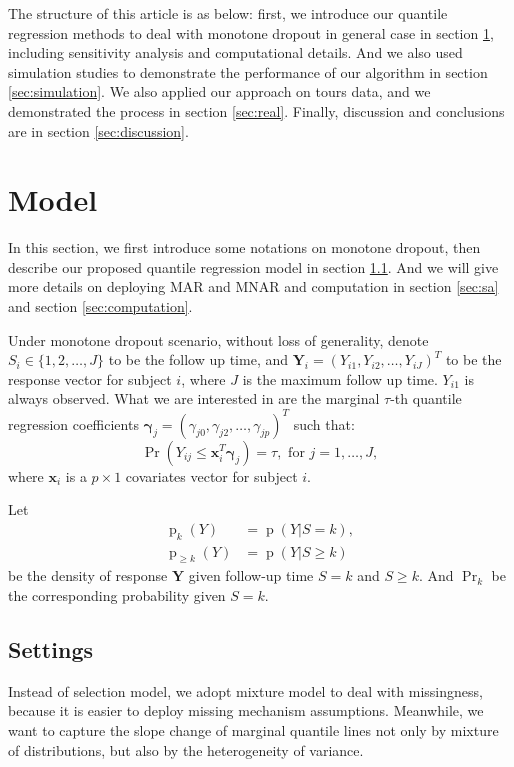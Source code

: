 \documentclass[12pt]{article}
\DeclareMathOperator{\pr}{p}
\DeclareMathOperator{\prob}{Pr}
\begin{document}
The structure of this article is as below: first, we introduce our
quantile regression methods to deal with monotone dropout in general
case in section \ref{sec:model}, including sensitivity analysis and
computational details.  And we also used simulation studies to
demonstrate the performance of our algorithm in section
\ref{sec:simulation}. We also applied our approach on tours data, and
we demonstrated the process in section \ref{sec:real}. Finally,
discussion and conclusions are in section \ref{sec:discussion}.

\section{Model}
\label{sec:model}

In this section, we first introduce some notations on monotone
dropout, then describe our proposed quantile regression model in
section \ref{sec:settings}. And we will give more details on deploying
MAR and MNAR and computation in section \ref{sec:sa} and section
\ref{sec:computation}.

Under monotone dropout scenario, without loss of generality, denote
$S_i \in \{1, 2, \ldots, J\}$ to be the follow up time, and $\bm Y_i =
(Y_{i1}, Y_{i2}, \ldots, Y_{iJ})^{T}$ to be the response vector for
subject $i$, where $J$ is the maximum follow up time. $Y_{i1}$ is
always observed. What we are interested in are the marginal $\tau$-th
quantile regression coefficients $\bm \gamma_j = (\gamma_{j0}, \gamma_{j2}, \ldots,
\gamma_{jp})^T$ such that:
\begin{equation}
  \label{eq:quantile}
  \prob (Y_{ij} \leq \bm x_i^{T} \bm \gamma_j ) = \tau, \text{ for } j = 1, \ldots, J,
\end{equation}
where $\bm x_i$ is a $p \times 1$ covariates vector for subject $i$.

Let
\begin{align*}
  \pr_k(Y) &= \pr (Y | S = k), \\
  \pr_{\geq k} (Y) & = \pr (Y | S \geq k)
\end{align*}
be the density of response $\bm Y$ given follow-up time $S=k$ and $S \geq
k$. And $\prob_k$ be the corresponding probability given $S = k$.

\subsection{Settings}
\label{sec:settings}
Instead of selection model, we adopt mixture model to deal with
missingness, because it is easier to deploy missing
mechanism assumptions. Meanwhile, we want to capture the slope change of marginal
quantile lines not only by mixture of distributions, but also by the
heterogeneity of variance.
\end{document}
